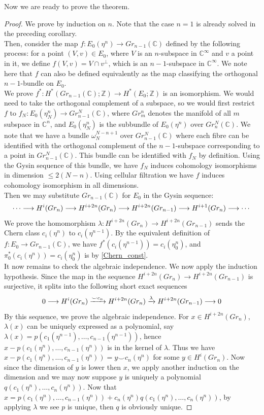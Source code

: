 	Now we are ready to prove the theorem. 
	\begin{proof}
		We prove by induction on $n$. Note that the case $n=1$ is already solved in the preceding corollary. \\
		Then, consider the map $f:E_0(\eta^n)\to Gr_{n-1}(\mathbb{C})$ defined by the following process: for a point $(V,v)\in E_0$, where $V$ is an $n$-subspace in $\mathbb{C}^\infty$ and $v$ a point in it, we define $f(V,v)=V\cap v^\bot$, which is an $n-1$-subspace in $\mathbb{C}^\infty$. We note here that $f$ can also be defined equivalently as the map classifying the orthogonal $n-1$-bundle on $E_0$. \\
		We prove $f^*:H^*(Gr_{n-1}(\mathbb{C});\mathbb{Z})\to H^*(E_0;\mathbb{Z})$ is an isomorphism. We would need to take the orthogonal complement of a subspace, so we would first restrict $f$ to $f_N:E_0(\eta_N^n)\to Gr_{n-1}^N(\mathbb{C})$, where $Gr_m^n$ denotes the manifold of all $m$ subspace in $\mathbb{C}^n$, and $E_0(\eta_N^n)$ is the subbundle of $E_0(\eta^n)$ over $Gr_n^N(\mathbb{C})$. We note that we have a bundle $\omega_N^{N-n+1}$ over $Gr_{n-1}^N(\mathbb{C})$ where each fibre can be identified with the orthogonal complement of the $n-1$-subspace corresponding to a point in $Gr_{n-1}^N(\mathbb{C})$. This bundle can be identified with $f_N$ by definition. Using the Gysin sequence of this bundle, we have $f_N$ induces cohomology isomorphisms in dimension $\le 2(N-n)$. Using cellular filtration we have $f$ induces cohomology isomorphism in all dimensions. \\
		Then we may substitute $Gr_{n-1}(\mathbb{C})$ for $E_0$ in the Gysin sequence: 
		\[ \cdots\longrightarrow H^i(Gr_n)\longrightarrow H^{i+2n}(Gr_n)\longrightarrow H^{i+2n}(Gr_{n-1})\longrightarrow H^{i+1}(Gr_n)\longrightarrow\cdots \]
		We prove the homomorphism $\lambda:H^{i+2n}(Gr_n)\to H^{i+2n}(Gr_{n-1})$ sends the Chern class $c_i(\eta^n)$ to $c_i(\eta^{n-1})$. By the equivalent definition of $f:E_0\to Gr_{n-1}(\mathbb{C})$, we have $f^*(c_i(\eta^{n-1}))=c_i(\eta_0^n)$, and $\pi_0^*(c_i(\eta^n))=c_i(\eta_0^n)$ is by \cref{Chern_const}. \\
		It now remains to check the algebraic independence. We now apply the induction hypothesis. Since the map in the sequence $H^{i+2n}(Gr_n)\to H^{i+2n}(Gr_{n-1})$ is surjective, it splits into the following short exact sequences
		\[ 0\longrightarrow H^i(Gr_n)\xrightarrow{\smile c_n} H^{i+2n}(Gr_n)\xrightarrow{\lambda} H^{i+2n}(Gr_{n-1})\longrightarrow 0 \]
		By this sequence, we prove the algebraic independence. For $x\in H^{i+2n}(Gr_n)$, $\lambda(x)$ can be uniquely expressed as a polynomial, say $\lambda(x)=p(c_1(\eta^{n-1}),\dots,c_{n-1}(\eta^{n-1}))$, hence \\
		$x-p(c_1(\eta^n),\dots,c_{n-1}(\eta^n))$ is in the kernel of $\lambda$. Thus we have $x-p(c_1(\eta^n),\dots,c_{n-1}(\eta^n))=y\smile c_n(\eta^n)$ for some $y\in H^i(Gr_n)$. Now since the dimension of $y$ is lower then $x$, we apply another induction on the dimension and we may now suppose $y$ is uniquely a polynomial $q(c_1(\eta^n),\dots,c_n(\eta^n))$. Now that $x=p(c_1(\eta^n),\dots,c_{n-1}(\eta^n))+c_n(\eta^n)q(c_1(\eta^n),\dots,c_n(\eta^n))$, by applying $\lambda$ we see $p$ is unique, then $q$ is obviously unique. 
	\end{proof}

